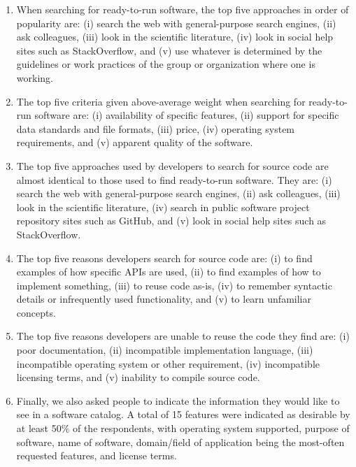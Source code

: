\documentclass{casicswhitepaper}
\begin{document}
\begin{enumerate}

\item When searching for ready-to-run software, the top five approaches in order of popularity are: (i) search the web with general-purpose search engines, (ii) ask colleagues, (iii) look in the scientific literature, (iv) look in social help sites such as StackOverflow, and (v) use whatever is determined by the guidelines or work practices of the group or organization where one is working.

\item The top five criteria given above-average weight when searching for ready-to-run software are: (i) availability of specific features, (ii) support for specific data standards and file formats, (iii) price, (iv) operating system requirements, and (v) apparent quality of the software.

\item The top five approaches used by developers to search for source code are almost identical to those used to find ready-to-run software.  They are: (i) search the web with general-purpose search engines, (ii) ask colleagues, (iii) look in the scientific literature, (iv) search in public software project repository sites such as GitHub, and (v) look in social help sites such as StackOverflow.

\item The top five reasons developers search for source code are: (i) to find examples of how specific APIs are used, (ii) to find examples of how to implement something, (iii) to reuse code as-is, (iv) to remember syntactic details or infrequently used functionality, and (v) to learn unfamiliar concepts.

\item The top five reasons developers are unable to reuse the code they find are: (i) poor documentation, (ii) incompatible implementation language, (iii) incompatible operating system or other requirement, (iv) incompatible licensing terms, and (v) inability to compile source code.

\item Finally, we also asked people to indicate the information they would like to see in a software catalog.  A total of 15 features were indicated as desirable by at least 50\% of the respondents, with operating system supported, purpose of software, name of software, domain/field of application being the most-often requested features, and license terms.

\end{enumerate}
\end{document}
